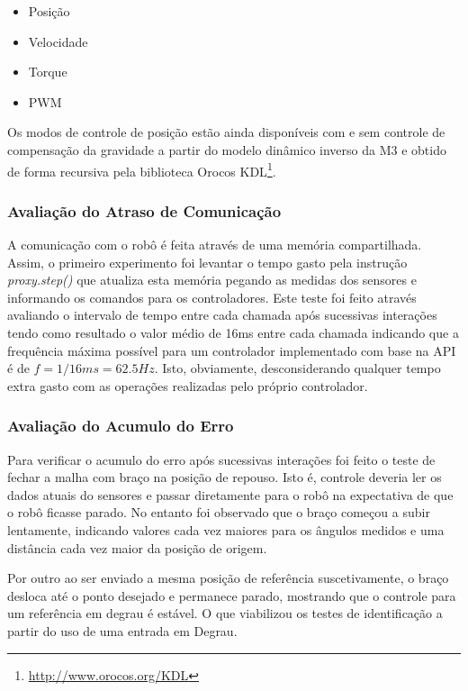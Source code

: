 \begin{itemize}
    \item Posição
    \item Velocidade
    \item Torque
    \item PWM
\end{itemize}

Os modos de controle de posição estão ainda disponíveis com e sem controle de compensação da gravidade a partir do modelo dinâmico inverso da M3 e obtido de forma recursiva pela biblioteca Orocos KDL\footnote{\url{http://www.orocos.org/KDL}}.

\subsubsection{Avaliação do Atraso de Comunicação}\label{subsec:deadtimepython}

A comunicação com o robô é feita através de uma memória compartilhada. Assim, o primeiro experimento foi levantar o tempo gasto pela instrução \textit{proxy.step()} que atualiza esta memória pegando as medidas dos sensores e informando os comandos para os controladores. Este teste foi feito através avaliando o intervalo de tempo entre cada chamada após sucessivas interações tendo como resultado o valor médio de 16ms entre cada chamada indicando que a frequência máxima possível para um controlador implementado com base na API é de $f = 1/16ms = 62.5Hz$. Isto, obviamente, desconsiderando qualquer tempo extra gasto com as operações realizadas pelo próprio controlador.

\subsubsection{Avaliação do Acumulo do Erro}

Para verificar o acumulo do erro após sucessivas interações foi feito o teste de fechar a malha com braço na posição de repouso. Isto é, controle deveria ler os dados atuais do sensores e passar diretamente para o robô na expectativa de que o robô ficasse parado. No entanto foi observado que o braço começou a subir lentamente, indicando valores cada vez maiores para os ângulos medidos e uma distância cada vez maior da posição de origem.

Por outro ao ser enviado a mesma posição de referência suscetivamente, o braço desloca até o ponto desejado e permanece parado, mostrando que o controle para um referência em degrau é estável. O que viabilizou os testes de identificação a partir do uso de uma entrada em Degrau.

